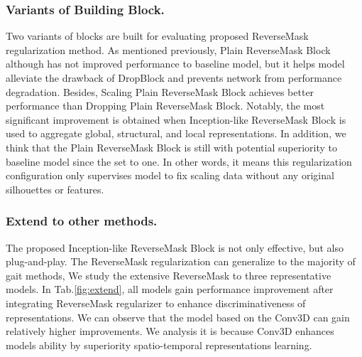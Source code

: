 \documentclass[runningheads]{llncs}
\begin{document}
\subsubsection{Variants of Building Block.} Two variants of blocks are built for evaluating proposed ReverseMask regularization method. As mentioned previously, Plain ReverseMask Block although has not improved performance to baseline model, but it helps model alleviate the drawback of DropBlock and prevents network from performance degradation. Besides, Scaling Plain ReverseMask Block achieves better performance than Dropping Plain ReverseMask Block. Notably, the most significant improvement is obtained when Inception-like ReverseMask Block is used to aggregate global, structural, and local representations. In addition, we think that the Plain ReverseMask Block is still with potential superiority to baseline model since the  set to one. In other words, it means this regularization configuration only supervises model to fix scaling data without any original silhouettes or features. 


\subsubsection{Extend to other methods.} The proposed Inception-like ReverseMask Block is not only effective, but also plug-and-play. The ReverseMask regularization can generalize to the majority of gait methods, We study the extensive ReverseMask to three representative models. In Tab.\ref{fig:extend}, all models gain performance improvement after integrating ReverseMask regularizer to enhance discriminativeness of representations. We can observe that the model based on the Conv3D can gain relatively higher improvements. We analysis it is because Conv3D enhances models ability by superiority spatio-temporal representations learning.
\end{document}
